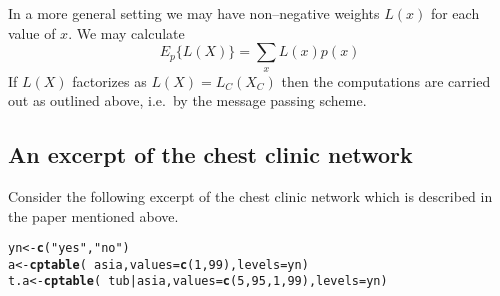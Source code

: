 \documentclass[10pt]{article}\usepackage[]{graphicx}\usepackage[]{color}
\makeatletter
\newcommand{\hlnum}[1]{\textcolor[rgb]{0.686,0.059,0.569}{#1}}%
\newcommand{\hlstr}[1]{\textcolor[rgb]{0.192,0.494,0.8}{#1}}%
\newcommand{\hlopt}[1]{\textcolor[rgb]{0,0,0}{#1}}%
\newcommand{\hlstd}[1]{\textcolor[rgb]{0.345,0.345,0.345}{#1}}%
\newcommand{\hlkwb}[1]{\textcolor[rgb]{0.69,0.353,0.396}{#1}}%
\newcommand{\hlkwc}[1]{\textcolor[rgb]{0.333,0.667,0.333}{#1}}%
\newcommand{\hlkwd}[1]{\textcolor[rgb]{0.737,0.353,0.396}{\textbf{#1}}}%
\newenvironment{kframe}{%
 \def\at@end@of@kframe{}%
 \ifinner\ifhmode%
  \def\at@end@of@kframe{\end{minipage}}%
  \begin{minipage}{\columnwidth}%
 \fi\fi%
 \def\FrameCommand##1{\hskip\@totalleftmargin \hskip-\fboxsep
 \colorbox{shadecolor}{##1}\hskip-\fboxsep
     \hskip-\linewidth \hskip-\@totalleftmargin \hskip\columnwidth}%
 \MakeFramed {\advance\hsize-\width
   \@totalleftmargin\z@ \linewidth\hsize
   \@setminipage}}%
 {\par\unskip\endMakeFramed%
 \at@end@of@kframe}
\newenvironment{knitrout}{}{} %
\makeatother
\begin{document}
In a more general setting we may have non--negative weights $L(x)$ for
each value of $x$. We may calculate
\begin{displaymath}
  E_p\{L(X)\} = \sum_x L(x)p(x)
\end{displaymath}
If $L(X)$ factorizes as $L(X)=L_C(X_C)$ then the computations are
carried out as outlined above, i.e.\ by the message passing scheme.


\subsection{An excerpt of the chest clinic network}
\label{sec:an-excerpt-chest}


Consider the following excerpt of
the chest clinic network which is described in the paper mentioned
above.

\begin{knitrout}
\color{fgcolor}\begin{kframe}
\begin{alltt}
\hlstd{yn} \hlkwb{<-} \hlkwd{c}\hlstd{(}\hlstr{"yes"}\hlstd{,}\hlstr{"no"}\hlstd{)}
\hlstd{a}    \hlkwb{<-} \hlkwd{cptable}\hlstd{(}\hlopt{~}\hlstd{asia,} \hlkwc{values}\hlstd{=}\hlkwd{c}\hlstd{(}\hlnum{1}\hlstd{,}\hlnum{99}\hlstd{),}\hlkwc{levels}\hlstd{=yn)}
\hlstd{t.a}  \hlkwb{<-} \hlkwd{cptable}\hlstd{(}\hlopt{~}\hlstd{tub}\hlopt{|}\hlstd{asia,} \hlkwc{values}\hlstd{=}\hlkwd{c}\hlstd{(}\hlnum{5}\hlstd{,}\hlnum{95}\hlstd{,}\hlnum{1}\hlstd{,}\hlnum{99}\hlstd{),}\hlkwc{levels}\hlstd{=yn)}


\end{alltt}
\end{kframe}
\end{knitrout}
\end{document}
